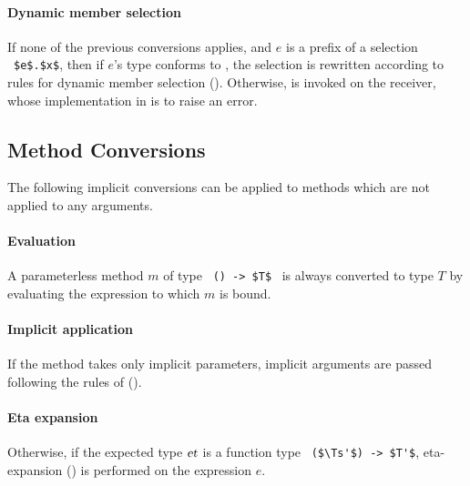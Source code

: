 \paragraph{Dynamic member selection}
If none of the previous conversions applies, and $e$ is a prefix of a selection ~\lstinline!$e$.$x$!, then if $e$'s type conforms to , the selection is rewritten according to rules for dynamic member selection (). Otherwise,  is invoked on the receiver, whose implementation in  is to raise an error. 






\subsection{Method Conversions}
\label{sec:method-conversions}

The following implicit conversions can be applied to methods which are not applied to any arguments. 

\paragraph{Evaluation}
A parameterless method $m$ of type ~\lstinline!() -> $T$!~ is always converted to type $T$ by evaluating the expression to which $m$ is bound. 

\paragraph{Implicit application}
If the method takes only implicit parameters, implicit arguments are passed following the rules of ().

\paragraph{Eta expansion}
Otherwise, if the expected type $\mbox{\sl et}$ is a function type ~\lstinline!($\Ts'$) -> $T'$!, eta-expansion () is performed on the expression $e$. 

